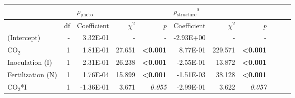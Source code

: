 \begin{landscape}
\begin{table}[]
{\begin{tabular}{p{3cm}p{0.5cm}p{1.75cm}p{1.5cm}p{1.5cm}p{1.75cm}p{1.5cm}p{1.5cm}p{1.75cm}p{1.5cm}p{1.5cm}}
            &&  \multicolumn{3}{l}{$\rho_\mathrm{photo}$} 
            &   \multicolumn{3}{l}{$\rho_\mathrm{structure}{}^a$} 
            &&& \\
            \hline
            & \multicolumn{1}{r}{df}
            & \multicolumn{1}{r}{Coefficient}   & \multicolumn{1}{r}{$\chi^{2}$}    & \multicolumn{1}{r}{\textit{p}} 
            & \multicolumn{1}{r}{Coefficient}   & \multicolumn{1}{r}{$\chi^{2}$}    & \multicolumn{1}{r}{\textit{p}} 
            \\
            \hline

            (Intercept) & \multicolumn{1}{r}{-}
            & \multicolumn{1}{r}{3.32E-01}      & \multicolumn{1}{r}{-}             & \multicolumn{1}{r}{-}
            & \multicolumn{1}{r}{-2.93E+00}     & \multicolumn{1}{r}{-}             & \multicolumn{1}{r}{-}
            & \multicolumn{1}{r}{}              & \multicolumn{1}{r}{}              & \multicolumn{1}{r}{}
            \\

            CO$_2$ & \multicolumn{1}{r}{1}
            & \multicolumn{1}{r}{1.81E-01}      & \multicolumn{1}{r}{27.651}        & \multicolumn{1}{r}{\textbf{<0.001}}
            & \multicolumn{1}{r}{8.77E-01}      & \multicolumn{1}{r}{229.571}       & \multicolumn{1}{r}{\textbf{<0.001}}
            & \multicolumn{1}{r}{}              & \multicolumn{1}{r}{}              & \multicolumn{1}{r}{} 
            \\

            Inoculation (I) & \multicolumn{1}{r}{1}
            & \multicolumn{1}{r}{2.31E-01}      & \multicolumn{1}{r}{26.238}        & \multicolumn{1}{r}{\textbf{<0.001}}
            & \multicolumn{1}{r}{-2.55E-01}     & \multicolumn{1}{r}{13.872}        & \multicolumn{1}{r}{\textbf{<0.001}}
            & \multicolumn{1}{r}{}              & \multicolumn{1}{r}{}              & \multicolumn{1}{r}{} 
            \\

            Fertilization (N) & \multicolumn{1}{r}{1}
            & \multicolumn{1}{r}{1.76E-04}      & \multicolumn{1}{r}{15.899}        & \multicolumn{1}{r}{\textbf{<0.001}}
            & \multicolumn{1}{r}{-1.51E-03}     & \multicolumn{1}{r}{38.128}        & \multicolumn{1}{r}{\textbf{<0.001}}
            & \multicolumn{1}{r}{}              & \multicolumn{1}{r}{}              & \multicolumn{1}{r}{} 
            \\

            CO$_2$*I & \multicolumn{1}{r}{1}
            & \multicolumn{1}{r}{-1.36E-01}     & \multicolumn{1}{r}{3.671}         & \multicolumn{1}{r}{\textit{0.055}}
            & \multicolumn{1}{r}{-2.99E-01}     & \multicolumn{1}{r}{3.622}         & \multicolumn{1}{r}{\textit{0.057}}
            & \multicolumn{1}{r}{}              & \multicolumn{1}{r}{}              & \multicolumn{1}{r}{} 
            \\


\end{tabular}}
\end{table}
\end{landscape}

